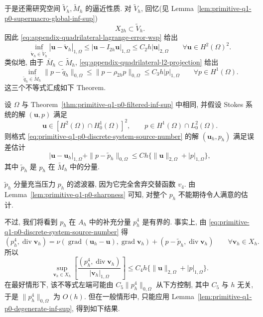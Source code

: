 于是还需研究空间 $\widetilde V_h,\widetilde M_h$ 的逼近性质.
对 $\widetilde V_h$, 回忆(见
Lemma~\ref{lem:primitive-q1-p0-supermacro-global-inf-sup})
\[
X_{2h}\subset\widetilde V_h.
\]
因此 \eqref{eq:appendix-quadrilateral-lagrange-error-wsp} 给出
\begin{equation}\label{eq:primitive-q1-p0-velocity-approximation}
\inf_{\tilde{\mathbf v}_h\in\widetilde V_h}
|\mathbf u-\tilde{\mathbf v}_h|_{1,\Omega}
\leq|\mathbf u-I_{2h}\mathbf u|_{1,\Omega}
\leq C_2h|\mathbf u|_{2,\Omega}
\qquad\forall\mathbf u\in H^2(\Omega)^2.
\end{equation}
类似地, 由于 $\bar M_h\subset\widetilde M_h$,
\eqref{eq:appendix-quadrilateral-l2-projection} 给出
\begin{equation}\label{eq:primitive-q1-p0-pressure-approximation}
\inf_{\tilde q_h\in\widetilde M_h}\|p-\tilde q_h\|_{0,\Omega}
\leq\|p-\rho_{2h}p\|_{0,\Omega}
\leq C_3h|p|_{1,\Omega}
\qquad\forall p\in H^1(\Omega).
\end{equation}
这三个不等式汇成如下 Theorem.

\setcounter{statement}{4}
\renewcommand{\theHstatement}{theorem.\thesection.\arabic{statement}}
\begin{Theorem}\label{thm:primitive-q1-p0-error}
设 $\Omega$ 与 Theorem~\ref{thm:primitive-q1-p0-filtered-inf-sup} 中相同,
并假设 Stokes 系统的解 $(\mathbf u,p)$ 满足
\[
\mathbf u\in[H^2(\Omega)\cap H_0^1(\Omega)]^2,
\qquad p\in H^1(\Omega)\cap L_0^2(\Omega).
\]
则格式 \eqref{eq:primitive-q1-p0-discrete-system-source-number} 的解
$(\mathbf u_h,p_h)$ 满足误差估计
\begin{equation}\label{eq:primitive-q1-p0-h1-pressure-error}
|\mathbf u-\mathbf u_h|_{1,\Omega}
+\|p-\tilde p_h\|_{0,\Omega}
\leq Ch\{\|\mathbf u\|_{2,\Omega}+|p|_{1,\Omega}\},
\end{equation}
其中 $\tilde p_h$ 是 $p_h$ 在 $\widetilde M_h$ 中的分量.
\end{Theorem}

$\tilde p_h$ 分量充当压力 $p_h$ 的滤波器, 因为它完全舍弃交替函数 $v_4$.
由 Lemma~\ref{lem:primitive-q1-p0-sharpness} 可知, 对整个 $p_h$ 不能期待令人满意的估计.

不过, 我们将看到 $p_h$ 在 $A_h$ 中的补充分量 $p_h^4$ 是有界的.
事实上, 由 \eqref{eq:primitive-q1-p0-discrete-system-source-number} 得
\[
(p_h^4,\operatorname{div}\mathbf v_h)
=\nu(\operatorname{grad}(\mathbf u_h-\mathbf u),
\operatorname{grad}\mathbf v_h)
+(p-\tilde p_h,\operatorname{div}\mathbf v_h)
\qquad\forall\mathbf v_h\in X_h.
\]
所以
\[
\sup_{\mathbf v_h\in X_h}
\left[\frac{(p_h^4,\operatorname{div}\mathbf v_h)}
{|\mathbf v_h|_{1,\Omega}}\right]
\leq C_4h\{\|\mathbf u\|_{2,\Omega}+|p|_{1,\Omega}\}.
\]
在最好情形下, 该不等式左端可能由
$C_5\|p_h^4\|_{0,\Omega}$ 从下方控制, 其中 $C_5$ 与 $h$ 无关,
于是 $\|p_h^4\|_{0,\Omega}$ 为 $O(h)$. 但在一般情形中, 只能应用
Lemma~\ref{lem:primitive-q1-p0-degenerate-inf-sup}, 得到如下结果.

